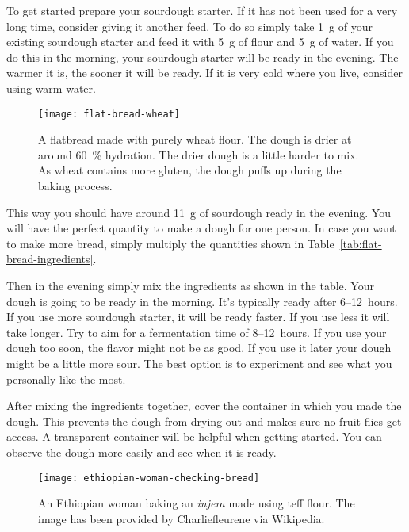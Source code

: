 To get started prepare your sourdough starter. If it has not been used for a very
long time, consider giving it another feed. To do so simply take \qty{1}{\gram} of your
existing sourdough starter and feed it with \qty{5}{\gram} of flour and \qty{5}{\gram} of water.
If you do this in the morning, your sourdough starter will be ready in the evening. The
warmer it is, the sooner it will be ready. If it is very cold where you live, consider
using warm water.

\begin{figure}[htb!]
\begin{center}
  \texttt{[image: flat-bread-wheat]}
  \caption{A flatbread made with purely wheat flour. The dough is drier
  at around \qty{60}{\percent} hydration. The drier dough is a little harder
  to mix. As wheat contains more gluten, the dough puffs up during
  the baking process.}
\end{center}
\end{figure}

This way you should have around \qty{11}{\gram} of sourdough ready in the evening. You will have
the perfect quantity to make a dough for one person. In case you want to make more
bread, simply multiply the quantities shown in
Table~\ref{tab:flat-bread-ingredients}.

Then in the evening simply mix the ingredients as shown in the table. Your dough
is going to be ready in the morning. It's typically ready after 6--12~hours. If
you use more sourdough starter, it will be ready faster. If you use less it will take
longer. Try to aim for a fermentation time of 8--12~hours. If you use
your dough too soon, the flavor might not be as good. If you use it later
your dough might be a little more sour. The best option is to experiment
and see what you personally like the most.

After mixing the ingredients together, cover the container in which
you made the dough. This prevents the dough from drying out and makes
sure no fruit flies get access. A transparent container will be helpful
when getting started. You can observe the dough more easily and see when
it is ready.

\begin{figure}[htb!]
\begin{center}
  \texttt{[image: ethiopian-woman-checking-bread]}
  \caption{An Ethiopian woman baking an \emph{injera} made using teff flour.
  The image has been provided by Charliefleurene via Wikipedia.}
\end{center}
\end{figure}

